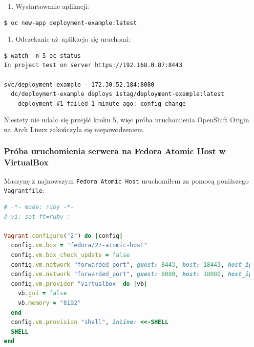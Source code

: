 \documentclass[a4paper,12pt,twoside,openany]{report}
\providecommand{\tightlist}{%
  \setlength{\itemsep}{0pt}\setlength{\parskip}{0pt}}
\newcommand{\passthrough}[1]{#1}
\begin{document}
\begin{enumerate}
\def\labelenumi{\arabic{enumi}.}
\setcounter{enumi}{4}
\tightlist
\item
  Wystartowanie aplikacji:
\end{enumerate}

\begin{lstlisting}
$ oc new-app deployment-example:latest
\end{lstlisting}

\begin{enumerate}
\def\labelenumi{\arabic{enumi}.}
\setcounter{enumi}{5}
\tightlist
\item
  Odczekanie aż~aplikacja się uruchomi:
\end{enumerate}

\begin{lstlisting}
$ watch -n 5 oc status
In project test on server https://192.168.0.87:8443

svc/deployment-example - 172.30.52.184:8080
  dc/deployment-example deploys istag/deployment-example:latest 
    deployment #1 failed 1 minute ago: config change
\end{lstlisting}

Niestety nie udało się przejść kroku 5, więc próba uruchomienia
OpenShift Origin na Arch Linux zakończyła się niepowodzeniem.

\hypertarget{pruxf3ba-uruchomienia-serwera-na-fedora-atomic-host-w-virtualbox}{%
\subsubsection{Próba uruchomienia serwera na Fedora Atomic Host w
VirtualBox}\label{pruxf3ba-uruchomienia-serwera-na-fedora-atomic-host-w-virtualbox}}

Maszynę z najnowszym \passthrough{\lstinline!Fedora Atomic Host!}
uruchomiłem za pomocą poniższego \passthrough{\lstinline!Vagrantfile!}:

\begin{lstlisting}[language=Ruby]
# -*- mode: ruby -*-
# vi: set ft=ruby :

Vagrant.configure("2") do |config|
  config.vm.box = "fedora/27-atomic-host"
  config.vm.box_check_update = false
  config.vm.network "forwarded_port", guest: 8443, host: 18443, host_ip: "127.0.0.1"
  config.vm.network "forwarded_port", guest: 8080, host: 18080, host_ip: "127.0.0.1"
  config.vm.provider "virtualbox" do |vb|
    vb.gui = false
    vb.memory = "8192"
  end
  config.vm.provision "shell", inline: <<-SHELL
  SHELL
end
\end{lstlisting}
\end{document}
